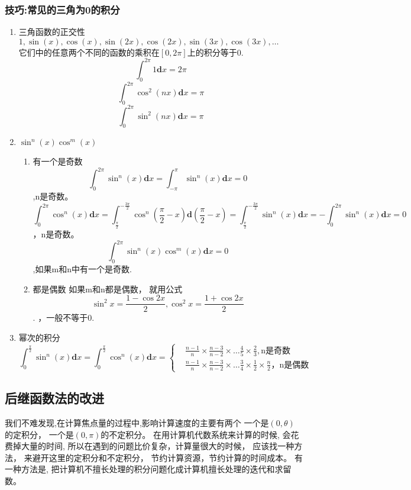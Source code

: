 \subsubsection{技巧:常见的三角为0的积分}
\begin{enumerate}
\item 三角函数的正交性
\(1,\sin(x),\cos(x),\sin(2x),\cos(2x),\sin(3x),\cos(3x),\dots\)\\
它们中的任意两个不同的函数的乘积在\([0,2\pi]\)上的积分等于0.
\[\int_{0}^{2\pi} 1\mathbf{d}x=2\pi\]
\[\int_{0}^{2\pi} \cos^2(nx) \mathbf{d}x=\pi\]
\[\int_{0}^{2\pi} \sin^2(nx) \mathbf{d}x=\pi\]
\item\( \sin^n(x)\cos^m(x)\)
  \begin{enumerate}
  \item 有一个是奇数
\[\int_{0}^{2\pi} \sin^n(x) \mathbf{d}x=\int_{-\pi}^{\pi} \sin^n(x) \mathbf{d}x=0\]
,n是奇数。\\
\[\int_{0}^{2\pi} \cos^n(x) \mathbf{d}x=
  \int_{\frac{\pi}{2}}^{-\frac{3\pi}{2}} \cos^n(\frac{\pi}{2}-x) \mathbf{d}(\frac{\pi}{2}-x)=
   \int_{\frac{\pi}{2}}^{-\frac{3\pi}{2}} \sin^n(x) \mathbf{d}x=
   - \int_{0}^{2\pi} \sin^n(x) \mathbf{d}x=
  0\]
，n是奇数。\\
\[\int_{0}^{2\pi}\sin^n(x) \cos^m(x) \mathbf{d}x=0\],如果m和n中有一个是奇数.\\
\item 都是偶数
如果m和n都是偶数，
就用公式
\[\sin ^2 x=\frac{1-\cos 2x}{2},\cos ^2 x =\frac{1+\cos 2x}{2}\].
，一般不等于0.
\end{enumerate}
\item 幂次的积分
  \[\int_{0}^{\frac{\pi}{2}}\sin^n(x) \mathbf{d}x
=\int_{0}^{\frac{\pi}{2}}\cos^n(x) \mathbf{d}x
=
\left\{
\begin{aligned}
&\frac{n-1}{n} \times \frac{n-3}{n-2} \times \dots \frac{4}{5} \times \frac{2}{3},\text{n是奇数}\\
&\frac{n-1}{n} \times \frac{n-3}{n-2} \times \dots \frac{3}{4} \times \frac {1}{2} \times \frac{n}{2}，\text{n是偶数}
\end{aligned}
\right.\]
\end{enumerate}

\subsection{后继函数法的改进}
我们不难发现,在计算焦点量的过程中,影响计算速度的主要有两个
一个是$(0,\theta)$的定积分，
一个是$(0,\pi)$的不定积分。
在用计算机代数系统来计算的时候,
会花费掉大量的时间,
所以在遇到的问题比价复杂，计算量很大的时候，
应该找一种方法，
来避开这里的定积分和不定积分，
节约计算资源，节约计算的时间成本。
有一种方法是,
把计算机不擅长处理的积分问题化成计算机擅长处理的迭代和求留数。
